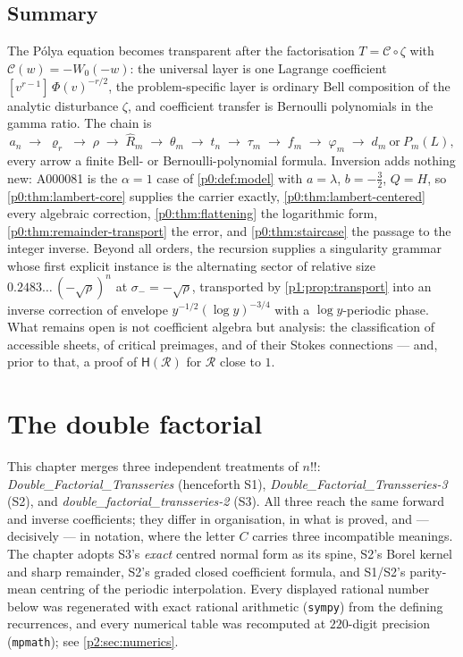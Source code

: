 \documentclass[11pt,a4paper,oneside]{book}
\theoremstyle{plain}
\theoremstyle{definition}
\theoremstyle{remark}
\newcommand{\Coef}[1]{[#1]\,}
\newcommand{\Wlam}{W}
\begin{document}
\section{Summary}
\label{p1:sec:summary}

The P\'olya equation becomes transparent after the factorisation $T=\mathcal C\circ\zeta$ with
$\mathcal C(w)=-\Wlam_0(-w)$: the universal layer is one Lagrange coefficient
$\Coef{v^{r-1}}\Phi(v)^{-r/2}$, the problem-specific layer is ordinary Bell composition of the
analytic disturbance $\zeta$, and coefficient transfer is Bernoulli polynomials in the gamma
ratio.  The chain is
\begin{equation}
 a_n\;\to\;\varrho_r\;\to\;\rho\;\to\;\widehat R_m\;\to\;\theta_m
 \;\to\;t_n\;\to\;\tau_m\;\to\;f_m\;\to\;\varphi_m
 \;\to\;d_m\ \text{or}\ P_m(L),
 \label{p1:eq:chain}
\end{equation}
every arrow a finite Bell- or Bernoulli-polynomial formula.  Inversion adds nothing new:
A000081 is the $\alpha=1$ case of \cref{p0:def:model} with $a=\lambda$, $b=-\tfrac32$, $Q=H$,
so \cref{p0:thm:lambert-core} supplies the carrier exactly, \cref{p0:thm:lambert-centered}
every algebraic correction, \cref{p0:thm:flattening} the logarithmic form,
\cref{p0:thm:remainder-transport} the error, and \cref{p0:thm:staircase} the passage to the
integer inverse. Beyond all orders, the recursion supplies a singularity grammar whose first
explicit instance is the alternating sector of relative size $0.2483\ldots\,(-\sqrt\rho)^{n}$
at $\sigma_-=-\sqrt\rho$, transported by \cref{p1:prop:transport} into an inverse correction
of envelope $y^{-1/2}(\log y)^{-3/4}$ with a $\log y$-periodic phase.  What remains open is
not coefficient algebra but analysis: the classification of accessible sheets, of critical
preimages, and of their Stokes connections --- and, prior to that, a proof of $\mathsf
H(\mathcal R)$ for $\mathcal R$ close to $1$.

\chapter{The double factorial}\label{p2:sec:top}

\begin{sourcebox}
This chapter merges three independent treatments of \(n!!\):
\emph{Double\_Factorial\_Transseries} (henceforth \textsf{S1}),
\emph{Double\_Factorial\_Transseries-3} (\textsf{S2}), and
\emph{double\_factorial\_transseries-2} (\textsf{S3}).
All three reach the same forward and inverse coefficients; they differ in
organisation, in what is proved, and --- decisively --- in notation, where the
letter \(C\) carries three incompatible meanings.  The chapter adopts
\textsf{S3}'s \emph{exact} centred normal form as its spine, \textsf{S2}'s Borel
kernel and sharp remainder, \textsf{S2}'s graded closed coefficient formula, and
\textsf{S1}/\textsf{S2}'s parity-mean centring of the periodic interpolation.
Every displayed rational number below was regenerated with exact rational
arithmetic (\texttt{sympy}) from the defining recurrences, and every numerical
table was recomputed at \(220\)-digit precision (\texttt{mpmath}); see
\cref{p2:sec:numerics}.
\end{sourcebox}
\end{document}
